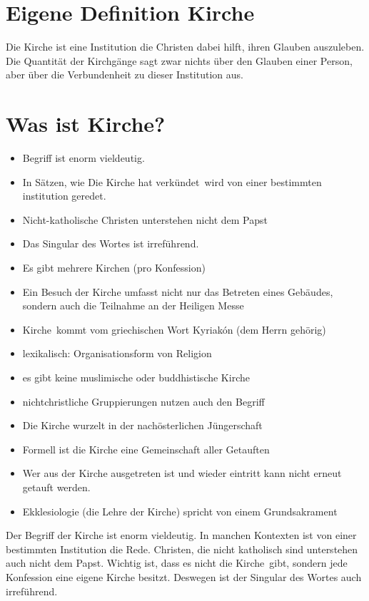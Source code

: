 \documentclass[../Religion.tex]{subfiles}
\begin{document}
	\section{Eigene Definition Kirche}
	Die Kirche ist eine Institution die Christen dabei hilft, ihren Glauben auszuleben.
	Die Quantität der Kirchgänge sagt zwar nichts über den Glauben einer Person, aber über die Verbundenheit zu dieser Institution aus.
	\section{Was ist Kirche?}
	\begin{itemize}
		\item Begriff ist enorm vieldeutig.
		\item In Sätzen, wie \dq Die Kirche hat verkündet\dq\ wird von einer bestimmten institution geredet.
		\item Nicht-katholische Christen unterstehen nicht dem Papst
		\item Das Singular des Wortes ist irreführend.
		\item Es gibt mehrere Kirchen (pro Konfession)
		\item Ein Besuch der Kirche umfasst nicht nur das Betreten eines Gebäudes, sondern auch die Teilnahme an der Heiligen Messe
		\item \dq Kirche\dq\ kommt vom griechischen Wort Kyriakón (dem Herrn gehörig)
		\item lexikalisch: Organisationsform von Religion
		\item es gibt keine muslimische oder buddhistische Kirche
		\item nichtchristliche Gruppierungen nutzen auch den Begriff
		\item Die Kirche wurzelt in der nachösterlichen Jüngerschaft
		\item Formell ist die Kirche eine Gemeinschaft aller Getauften
		\item Wer aus der Kirche ausgetreten ist und wieder eintritt kann nicht erneut getauft werden.
		\item Ekklesiologie (die Lehre der Kirche) spricht von einem \dq Grundsakrament\dq
	\end{itemize}
	Der Begriff der Kirche ist enorm vieldeutig.
	In manchen Kontexten ist von einer bestimmten Institution die Rede.
	Christen, die nicht katholisch sind unterstehen auch nicht dem Papst.
	Wichtig ist, dass es nicht \dq die Kirche\dq\ gibt, sondern jede Konfession eine eigene Kirche besitzt. Deswegen ist der Singular des Wortes auch irreführend.
\end{document}
